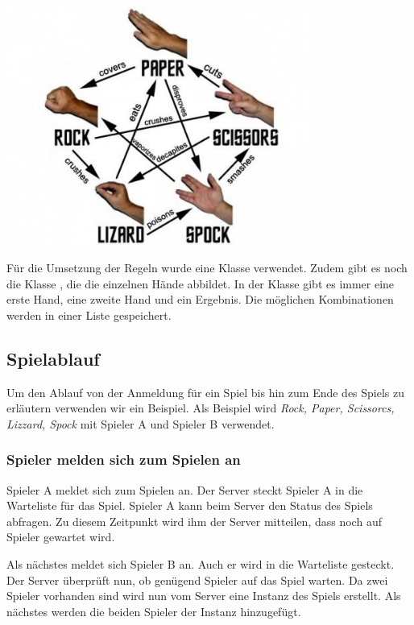 \begin{capfigure}
	\includegraphics[width=10cm]{images/rpssl_rules}
\end{capfigure}

Für die Umsetzung der Regeln wurde eine Klasse  verwendet. Zudem gibt es noch die Klasse , die die einzelnen Hände abbildet. In der Klasse  gibt es immer eine erste Hand, eine zweite Hand und ein Ergebnis. Die möglichen Kombinationen werden in einer Liste gespeichert.

\subsection{Spielablauf}
Um den Ablauf von der Anmeldung für ein Spiel bis hin zum Ende des Spiels zu erläutern verwenden wir ein Beispiel. Als Beispiel wird \textit{Rock, Paper, Scissorcs, Lizzard, Spock} mit Spieler A und Spieler B verwendet.

\subsubsection{Spieler melden sich zum Spielen an}
Spieler A meldet sich zum Spielen an. Der Server steckt Spieler A in die Warteliste für das Spiel. Spieler A kann beim Server den Status des Spiels abfragen. Zu diesem Zeitpunkt wird ihm der Server mitteilen, dass noch auf Spieler gewartet wird.

Als nächstes meldet sich Spieler B an. Auch er wird in die Warteliste gesteckt. Der Server überprüft nun, ob genügend Spieler auf das Spiel warten. Da zwei Spieler vorhanden sind wird nun vom Server eine Instanz des Spiels erstellt. Als nächstes werden die beiden Spieler der Instanz hinzugefügt.

